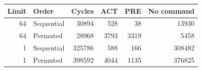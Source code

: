 \begin{tabular}{rlrrrr}
\toprule
Limit & Order & Cycles & ACT & PRE & No command \\
\midrule
64 & Sequential & 30894 & 528 & 38 & 13930 \\
64 & Permuted & 28968 & 3793 & 3319 & 5458 \\
1 & Sequential & 325786 & 588 & 166 & 308482 \\
1 & Permuted & 398592 & 4044 & 1135 & 376825 \\
\bottomrule
\end{tabular}
